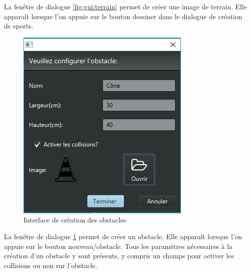 La fenêtre de dialogue \ref{fig:gui:terrain} permet de créer une image de terrain.
Elle apparaît lorsque l'on appuie sur le bouton dessiner dans le dialogue de création de sports.

\begin{figure}[htpb]
    \centering
    \includegraphics[scale=0.6]{fig/gui/newObstacle.png}
    \caption{Interface de création des obstacles}
    \label{fig:gui:newObstacle}
\end{figure}

La fenêtre de dialogue \ref{fig:gui:newObstacle} permet de créer un obstacle.
Elle apparaît lorsque l'on appuie sur le bouton nouveau/obstacle.
Tous les paramètres nécessaires à la création d'un obstacle y sont présents, y compris un champs pour activer les collisions ou non sur l'obstacle.
